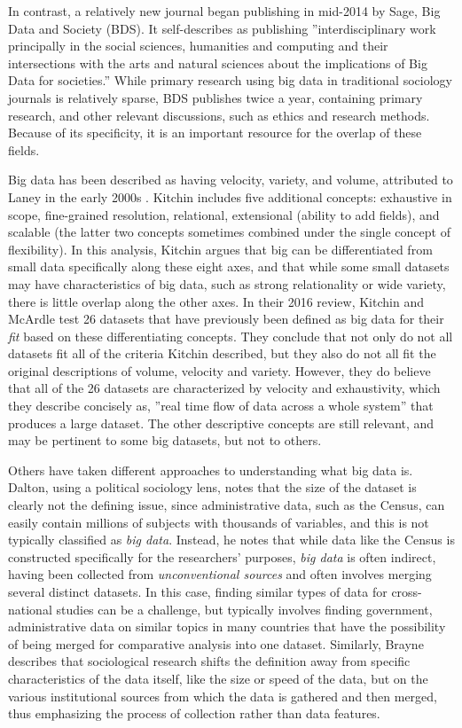 \documentclass[sigconf]{acmart}
\begin{document}
In contrast, a relatively new journal began publishing in mid-2014 by Sage, Big Data and Society (BDS).  It self-describes as publishing ''interdisciplinary work principally in the social sciences, humanities and computing and their intersections with the arts and natural sciences about the implications of Big Data for societies.''  While primary research using big data in traditional sociology journals is relatively sparse, BDS publishes twice a year, containing primary research, and other relevant discussions, such as ethics and research methods.  Because of its specificity, it is an important resource for the overlap of these fields.

Big data has been described as having velocity, variety, and volume, attributed to Laney in the early 2000s \cite{japec15}.  Kitchin \cite{kitchin14} includes five additional concepts: exhaustive in scope, fine-grained resolution, relational, extensional (ability to add fields), and scalable (the latter two concepts sometimes combined under the single concept of flexibility).  In this analysis, Kitchin argues that big can be differentiated from small data specifically along these eight axes, and that while some small datasets may have characteristics of big data, such as strong relationality or wide variety, there is little overlap along the other axes.   In their 2016 review, Kitchin and McArdle \cite{kitchin16} test 26 datasets that have previously been defined as big data for their {\em fit} based on these differentiating concepts.  They conclude that not only do not all datasets fit all of the criteria Kitchin described, but they also do not all fit the original descriptions of volume, velocity and variety.  However, they do believe that all of the 26 datasets are characterized by velocity and exhaustivity, which they describe concisely as, ''real time flow of data across a whole system'' that produces a large dataset.  The other descriptive concepts are still relevant, and may be pertinent to some big datasets, but not to others.

Others have taken different approaches to understanding what big data is.  Dalton, using a political sociology lens, \cite{dalton16} notes that the size of the dataset is clearly not the defining issue, since administrative data, such as the Census, can easily contain millions of subjects with thousands of variables, and this is not typically classified as {\em big data}.  Instead, he notes that while data like the Census is constructed specifically for the researchers' purposes, {\em big data} is often indirect, having been collected from {\em unconventional sources} and often involves merging several distinct datasets.  In this case, finding similar types of data for cross-national studies can be a challenge, but typically involves finding government, administrative data on similar topics in many countries that have the possibility of being merged for comparative analysis into one dataset.  Similarly, Brayne \cite {brayne17} describes that sociological research shifts the definition away from specific characteristics of the data itself, like the size or speed of the data, but on the various institutional sources from which the data is gathered and then merged, thus emphasizing the process of collection rather than data features.
\end{document}

